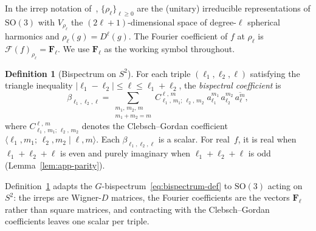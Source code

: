 \documentclass{article}
\theoremstyle{definition}
\newtheorem{definition}[theorem]{Definition}
\theoremstyle{remark}
\newcommand{\SO}{\mathrm{SO}}
\newcommand{\CG}[6]{C^{#5,\,#6}_{#1,\,#2;\,#3,\,#4}}
\newcommand{\abs}[1]{\lvert #1 \rvert}
\newcommand{\conj}[1]{\overline{#1}}
\theoremstyle{definition}
\begin{document}
\noindent
In the irrep notation of~\citet{mataigne2024selective},
$\{\rho_\ell\}_{\ell\ge 0}$ are the (unitary) irreducible
representations of $\SO(3)$ with $V_{\rho_\ell}$ the
$(2\ell{+}1)$-dimensional space of degree-$\ell$ spherical harmonics
and $\rho_\ell(g)=D^\ell(g)$. The Fourier coefficient of $f$ at
$\rho_\ell$ is $\mathcal{F}(f)_{\rho_\ell}=\mathbf{F}_\ell$. We use
$\mathbf{F}_\ell$ as the working symbol throughout.

\begin{definition}[Bispectrum on $S^2$]\label{def:app-bispectrum}
For each triple $(\ell_1, \ell_2, \ell)$ satisfying the triangle
inequality $\abs{\ell_1 - \ell_2} \le \ell \le \ell_1 + \ell_2$,
the \emph{bispectral coefficient} is
\begin{equation}\label{eq:app-bispectrum}
  \beta_{\ell_1,\ell_2,\ell}
  = \sum_{\substack{m_1,\,m_2,\,m \\ m_1+m_2=m}}
    \CG{\ell_1}{m_1}{\ell_2}{m_2}{\ell}{m}\;
    a_{\ell_1}^{m_1}\,a_{\ell_2}^{m_2}\,\conj{a_\ell^m},
\end{equation}
where $\CG{\ell_1}{m_1}{\ell_2}{m_2}{\ell}{m}$ denotes the
Clebsch--Gordan coefficient
$\langle \ell_1, m_1;\, \ell_2, m_2 \mid \ell, m \rangle$.
Each $\beta_{\ell_1,\ell_2,\ell}$ is a scalar. For real~$f$, it is
real when $\ell_1{+}\ell_2{+}\ell$ is even and purely imaginary when
$\ell_1{+}\ell_2{+}\ell$ is odd (Lemma~\ref{lem:app-parity}).
\end{definition}

Definition~\ref{def:app-bispectrum} adapts the $G$-bispectrum~\eqref{eq:bispectrum-def}
to $\SO(3)$ acting on~$S^2$: the irreps are Wigner-$D$ matrices, the Fourier coefficients are the vectors
$\mathbf{F}_\ell$ rather than square matrices, and contracting with the Clebsch--Gordan
coefficients leaves one scalar per triple.
\end{document}
